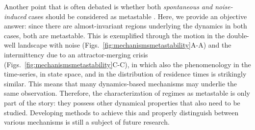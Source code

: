 Another point that is often debated is whether both \textit{spontaneous and noise-induced} cases should be considered as metastable \cite{kelso2012multistability, cavanna2018dynamic, hudson2017metastability}. Here, we provide an objective answer: since there are almost-invariant regions underlying the dynamics in both cases, both are metastable. This is exemplified through the motion in the double-well landscape with noise (Figs.~\ref{fig:mechanismsmetastability}A-A\ssupprime) and the intermittency due to an attractor-merging crisis (Figs.~\ref{fig:mechanismsmetastability}C-C\ssupprime), in which also the phenomenology in the time-series, in state space, and in the distribution of residence times is strikingly similar. This means that many dynamics-based mechanisms may underlie the same observation. Therefore, the characterization of regimes as metastable is only part of the story: they possess other dynamical properties that also need to be studied. Developing methods to achieve this and properly distinguish between various mechanisms is still a subject of future research.

